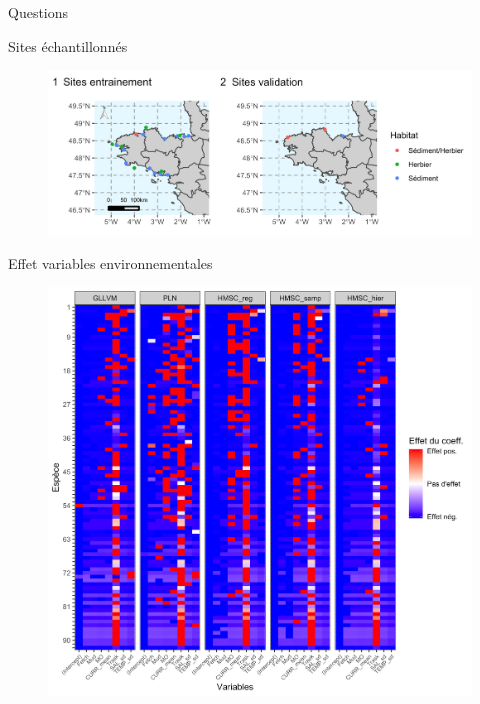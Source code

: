 \documentclass[%
]{beamer}
\begin{document}
	\appendix
	
	\begin{frame}[standout]
		Questions
	\end{frame}
	
	\begin{frame}{Sites échantillonnés}
	\begin{figure}[t]
		\begin{center}
			\includegraphics[scale =0.13]{figs/site_map3.png}%
		\end{center}
	\end{figure}
	\end{frame}
	
	\begin{frame}{Effet variables environnementales}
		\begin{figure}[t]
		\begin{center}
			\includegraphics[scale =0.09]{figs/effect_env.png}%
		\end{center}
	\end{figure}
	\end{frame}
	
\end{document}
